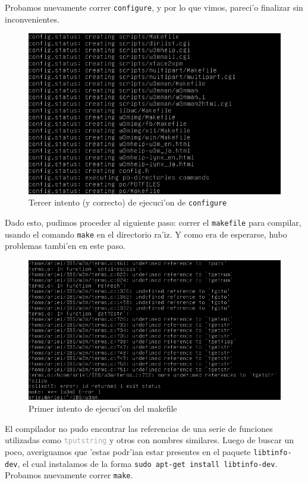 \documentclass[11pt]{article}
\begin{document}
		Probamos nuevamente correr \texttt{configure}, y por lo que vimos, pareci'o finalizar sin inconvenientes.
		
		\begin{figure}[H]
			\centering \captionsetup{justification=centering}
			\includegraphics[width=.8\linewidth]{Images/Compile_w3m/configure_successful}
			\caption{Tercer intento (y correcto) de ejecuci'on de \texttt{configure}}
			\label{fig:configure_successful}
		\end{figure}
		
		Dado esto, pudimos proceder al siguiente paso: correr el \texttt{makefile} para compilar, usando el comando \texttt{make} en el directorio ra'iz. Y como era de esperarse, hubo problemas tambi'en en este paso.
		
		\begin{figure}[H]
			\centering \captionsetup{justification=centering}
			\includegraphics[width=.8\linewidth]{Images/Compile_w3m/libtinfo-dev_missing}
			\caption{Primer intento de ejecuci'on del makefile}
			\label{fig:libtinfo-dev_missing}
		\end{figure}
		
		El compilador no pudo encontrar las referencias de una serie de funciones utilizadas como \texttt{\textcolor{darkgray}{tputstring}} y otros con nombres similares. Luego de buscar un poco, averiguamos que 'estas podr'ian estar presentes en el paquete \texttt{libtinfo-dev}, el cual instalamos de la forma \texttt{sudo apt-get install libtinfo-dev}. Probamos nuevamente correr \texttt{make}.
		
\end{document}
